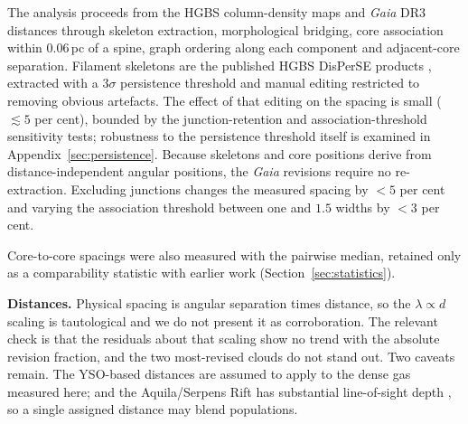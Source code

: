\documentclass[usenatbib,twoside,twocolumn]{mnras}
\begin{document}
The analysis proceeds from the HGBS column-density maps and \textit{Gaia} DR3 distances through skeleton extraction, morphological bridging, core association within $0.06$\,pc of a spine, graph ordering along each component and adjacent-core separation. Filament skeletons are the published HGBS DisPerSE products \citep{Sousbie2011,Arzoumanian2011}, extracted with a $3\sigma$ persistence threshold and manual editing restricted to removing obvious artefacts. The effect of that editing on the spacing is small ($\lesssim5$ per cent), bounded by the junction-retention and association-threshold sensitivity tests; robustness to the persistence threshold itself is examined in Appendix~\ref{sec:persistence}. Because skeletons and core positions derive from distance-independent angular positions, the \textit{Gaia} revisions require no re-extraction. Excluding junctions changes the measured spacing by $<5$ per cent and varying the association threshold between one and $1.5$ widths by $<3$ per cent.

Core-to-core spacings were also measured with the pairwise median, retained only as a comparability statistic with earlier work (Section~\ref{sec:statistics}).

\smallskip\noindent\textbf{Distances.} Physical spacing is angular separation times distance, so the $\lambda\propto d$ scaling is tautological and we do not present it as corroboration. The relevant check is that the residuals about that scaling show no trend with the absolute revision fraction, and the two most-revised clouds do not stand out. Two caveats remain. The YSO-based distances \citep{Zhang2023} are assumed to apply to the dense gas measured here; and the Aquila/Serpens Rift has substantial line-of-sight depth \citep{Zucker2020,Green2024}, so a single assigned distance may blend populations.
\end{document}
